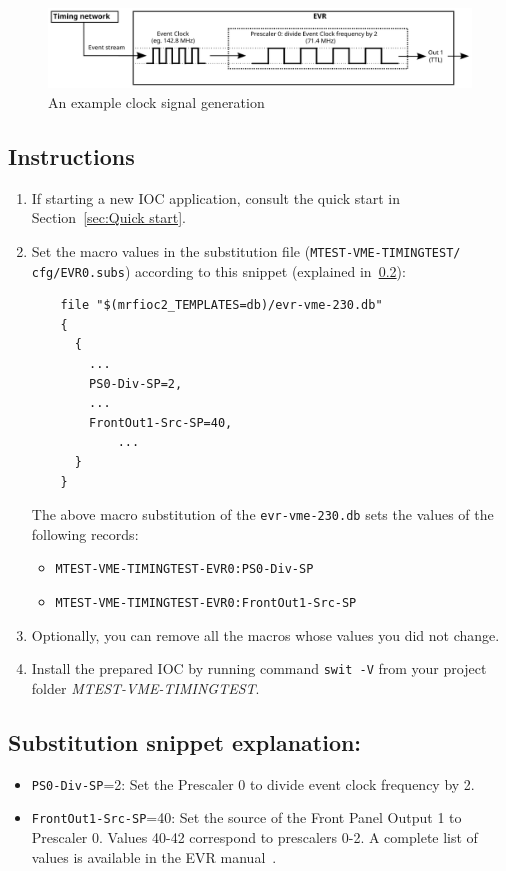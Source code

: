 \documentclass[12pt,a4paper]{article}
\begin{document}
\begin{figure}[H]
	\centering
	\includegraphics[width=\columnwidth]{./img/prescaler}
	\caption{An example clock signal generation}
	\label{fig:prescaler}
\end{figure}

\subsection{Instructions}
\begin{enumerate}
	\item If starting a new IOC application, consult the quick start in Section~\ref{sec:Quick start}.

	\item Set the macro values in the substitution file (\texttt{MTEST-VME-TIMINGTEST/} \texttt{cfg/EVR0.subs}) according to this snippet (explained in~\ref{sec:explain_clock}):
\begin{verbatim}
	file "$(mrfioc2_TEMPLATES=db)/evr-vme-230.db"
	{
	  {
	    ...
	    PS0-Div-SP=2,
	    ...
	    FrontOut1-Src-SP=40,
		    ...
	  }
	}
\end{verbatim}
	The above macro substitution of the \texttt{evr-vme-230.db} sets the values of the following records:
	\begin{itemize}
		\item \texttt{MTEST-VME-TIMINGTEST-EVR0:PS0-Div-SP}
		\item \texttt{MTEST-VME-TIMINGTEST-EVR0:FrontOut1-Src-SP}
	\end{itemize}
	
	\item Optionally, you can remove all the macros whose values you did not change. 
	\item Install the prepared IOC by running command \texttt{swit -V} from your project folder \textit{MTEST-VME-TIMINGTEST}.
\end{enumerate}

\subsection{Substitution snippet explanation:}\label{sec:explain_clock}
\begin{itemize}
	\item \texttt{PS0-Div-SP}=2: Set the Prescaler 0 to divide event clock frequency by 2.
	\item \texttt{FrontOut1-Src-SP}=40: Set the source of the Front Panel Output 1 to Prescaler 0. Values 40-42 correspond to prescalers 0-2. A complete list of values is available in the EVR manual~\cite{evr_manual}.
\end{itemize}
\end{document}
